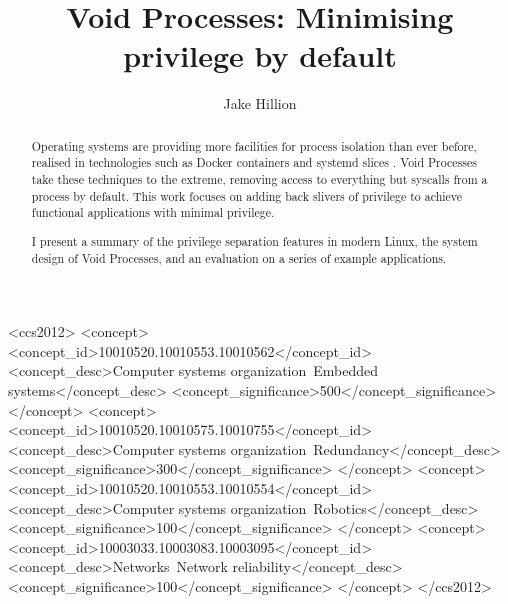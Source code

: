 \documentclass[sigplan]{acmart}
\begin{document}
\title[Void Processes]{Void Processes: Minimising privilege by default}

\author{Jake Hillion}


\begin{abstract}
Operating systems are providing more facilities for process isolation than ever before, realised in technologies such as Docker containers \citep{merkel_docker_2014} and systemd slices \citep{the_systemd_authors_systemdslice_2022}. Void Processes take these techniques to the extreme, removing access to everything but syscalls from a process by default. This work focuses on adding back slivers of privilege to achieve functional applications with minimal privilege.

I present a summary of the privilege separation features in modern Linux, the system design of Void Processes, and an evaluation on a series of example applications. 
\end{abstract}

\begin{CCSXML}
<ccs2012>
 <concept>
  <concept_id>10010520.10010553.10010562</concept_id>
  <concept_desc>Computer systems organization~Embedded systems</concept_desc>
  <concept_significance>500</concept_significance>
 </concept>
 <concept>
  <concept_id>10010520.10010575.10010755</concept_id>
  <concept_desc>Computer systems organization~Redundancy</concept_desc>
  <concept_significance>300</concept_significance>
 </concept>
 <concept>
  <concept_id>10010520.10010553.10010554</concept_id>
  <concept_desc>Computer systems organization~Robotics</concept_desc>
  <concept_significance>100</concept_significance>
 </concept>
 <concept>
  <concept_id>10003033.10003083.10003095</concept_id>
  <concept_desc>Networks~Network reliability</concept_desc>
  <concept_significance>100</concept_significance>
 </concept>
</ccs2012>
\end{CCSXML}
\end{document}
